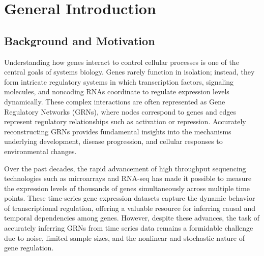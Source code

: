 
\chapter{General Introduction} %

\label{Chapter1} %


\newcommand{\keyword}[1]{\textbf{#1}}
\newcommand{\tabhead}[1]{\textbf{#1}}
\newcommand{\code}[1]{\texttt{#1}}
\newcommand{\file}[1]{\texttt{\bfseries#1}}
\newcommand{\option}[1]{\texttt{\itshape#1}}


\section{Background and Motivation}
Understanding how genes interact to control cellular processes is one of the central goals of systems biology. Genes rarely function in isolation; instead, they form intricate regulatory systems in which transcription factors, signaling molecules, and noncoding RNAs coordinate to regulate expression levels dynamically. These complex interactions are often represented as Gene Regulatory Networks (GRNs), where nodes correspond to genes and edges represent regulatory relationships such as activation or repression. Accurately reconstructing GRNs provides fundamental insights into the mechanisms underlying development, disease progression, and cellular responses to environmental changes.

Over the past decades, the rapid advancement of high throughput sequencing technologies such as microarrays and RNA-seq has made it possible to measure the expression levels of thousands of genes simultaneously across multiple time points. These time-series gene expression datasets capture the dynamic behavior of transcriptional regulation, offering a valuable resource for inferring causal and temporal dependencies among genes. However, despite these advances, the task of accurately inferring GRNs from time series data remains a formidable challenge due to noise, limited sample sizes, and the nonlinear and stochastic nature of gene regulation.

